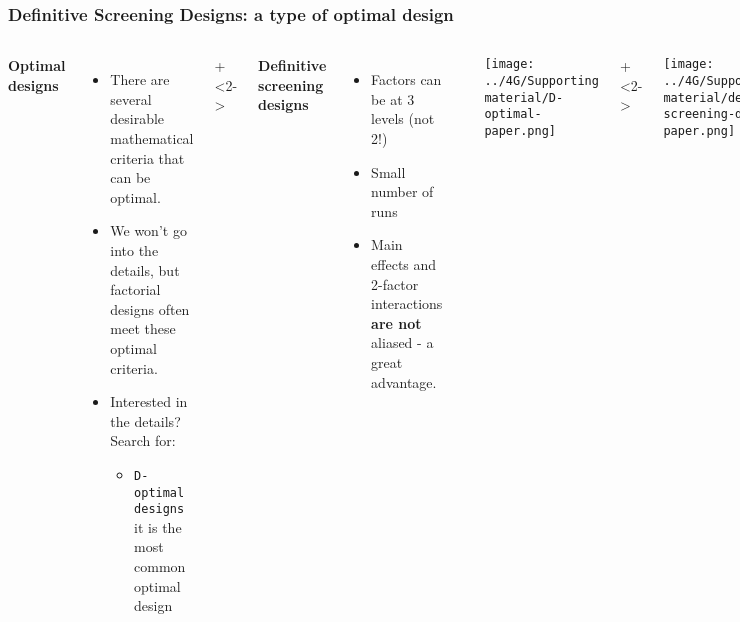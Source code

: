 \begin{frame}\frametitle{Definitive Screening Designs: a type of optimal design}
	\begin{columns}[T]
			\textbf{Optimal designs}
			
			\begin{itemize}
				\item	There are several desirable mathematical criteria that can be optimal.
				\item	We won't go into the details, but factorial designs often meet these optimal criteria.
				
				\item	Interested in the details? Search for:
					\begin{itemize}
						\item	\texttt{D-optimal designs}\\
							it is the most common optimal design
					\end{itemize}
			\end{itemize}
			
			\onslide+<2->{
			\textbf{Definitive screening designs}
				\begin{itemize}
					\item	Factors can be at 3 levels (not 2!)
					\item	Small number of runs
					\item	Main effects and 2-factor interactions \textbf{are not} aliased - a great advantage.
				\end{itemize}
			}
			\rule[3mm]{0.01cm}{90mm}
			
			\centerline{\texttt{[image: ../4G/Supporting material/D-optimal-paper.png]}}
		
			\onslide+<2->{
				\vspace{1cm}
				\centerline{\texttt{[image: ../4G/Supporting material/definitive-screening-design-paper.png]}}
			}
			
	\end{columns}	
\end{frame}

